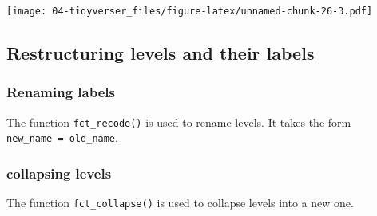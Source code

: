 \documentclass[
]{book}
\newenvironment{Shaded}{\begin{snugshade}}{\end{snugshade}}
\newcommand{\CommentTok}[1]{\textcolor[rgb]{0.56,0.35,0.01}{\textit{#1}}}
\newcommand{\FunctionTok}[1]{\textcolor[rgb]{0.00,0.00,0.00}{#1}}
\newcommand{\NormalTok}[1]{#1}
\newcommand{\OtherTok}[1]{\textcolor[rgb]{0.56,0.35,0.01}{#1}}
\newcommand{\SpecialCharTok}[1]{\textcolor[rgb]{0.00,0.00,0.00}{#1}}
\newcommand{\StringTok}[1]{\textcolor[rgb]{0.31,0.60,0.02}{#1}}
\begin{document}
\texttt{[image: 04-tidyverser\_files/figure-latex/unnamed-chunk-26-3.pdf]}

\hypertarget{restructuring-levels-and-their-labels}{%
\subsection{Restructuring levels and their labels}\label{restructuring-levels-and-their-labels}}

\hypertarget{renaming-labels}{%
\subsubsection{Renaming labels}\label{renaming-labels}}

The function \texttt{fct\_recode()} is used to rename levels. It takes the form \texttt{new\_name\ =\ old\_name}.

\begin{Shaded}
\end{Shaded}

\hypertarget{collapsing-levels}{%
\subsubsection{collapsing levels}\label{collapsing-levels}}

The function \texttt{fct\_collapse()} is used to collapse levels into a new one.
\end{document}
